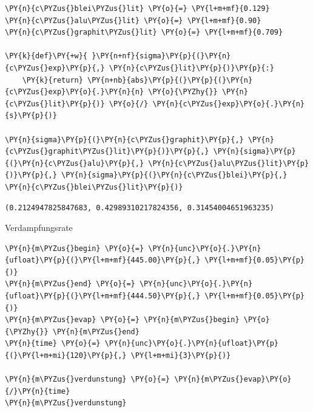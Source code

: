     \begin{tcolorbox}[breakable, size=fbox, boxrule=1pt, pad at break*=1mm,colback=cellbackground, colframe=cellborder]
\begin{Verbatim}[commandchars=\\\{\}]
\PY{n}{c\PYZus{}blei\PYZus{}lit} \PY{o}{=} \PY{l+m+mf}{0.129}
\PY{n}{c\PYZus{}alu\PYZus{}lit} \PY{o}{=} \PY{l+m+mf}{0.90}
\PY{n}{c\PYZus{}graphit\PYZus{}lit} \PY{o}{=} \PY{l+m+mf}{0.709}

\PY{k}{def}\PY{+w}{ }\PY{n+nf}{sigma}\PY{p}{(}\PY{n}{c\PYZus{}exp}\PY{p}{,} \PY{n}{c\PYZus{}lit}\PY{p}{)}\PY{p}{:}
    \PY{k}{return} \PY{n+nb}{abs}\PY{p}{(}\PY{p}{(}\PY{n}{c\PYZus{}exp}\PY{o}{.}\PY{n}{n} \PY{o}{\PYZhy{}} \PY{n}{c\PYZus{}lit}\PY{p}{)} \PY{o}{/} \PY{n}{c\PYZus{}exp}\PY{o}{.}\PY{n}{s}\PY{p}{)} 

\PY{n}{sigma}\PY{p}{(}\PY{n}{c\PYZus{}graphit}\PY{p}{,} \PY{n}{c\PYZus{}graphit\PYZus{}lit}\PY{p}{)}\PY{p}{,} \PY{n}{sigma}\PY{p}{(}\PY{n}{c\PYZus{}alu}\PY{p}{,} \PY{n}{c\PYZus{}alu\PYZus{}lit}\PY{p}{)}\PY{p}{,} \PY{n}{sigma}\PY{p}{(}\PY{n}{c\PYZus{}blei}\PY{p}{,} \PY{n}{c\PYZus{}blei\PYZus{}lit}\PY{p}{)}
\end{Verbatim}
\end{tcolorbox}

            \begin{tcolorbox}[breakable, size=fbox, boxrule=.5pt, pad at break*=1mm, opacityfill=0]
\begin{Verbatim}[commandchars=\\\{\}]
(0.2124947825847683, 0.42989310217824356, 0.31454004651963235)
\end{Verbatim}
\end{tcolorbox}
        
    Verdampfungsrate

    \begin{tcolorbox}[breakable, size=fbox, boxrule=1pt, pad at break*=1mm,colback=cellbackground, colframe=cellborder]
\begin{Verbatim}[commandchars=\\\{\}]
\PY{n}{m\PYZus{}begin} \PY{o}{=} \PY{n}{unc}\PY{o}{.}\PY{n}{ufloat}\PY{p}{(}\PY{l+m+mf}{445.00}\PY{p}{,} \PY{l+m+mf}{0.05}\PY{p}{)}
\PY{n}{m\PYZus{}end} \PY{o}{=} \PY{n}{unc}\PY{o}{.}\PY{n}{ufloat}\PY{p}{(}\PY{l+m+mf}{444.50}\PY{p}{,} \PY{l+m+mf}{0.05}\PY{p}{)}
\PY{n}{m\PYZus{}evap} \PY{o}{=} \PY{n}{m\PYZus{}begin} \PY{o}{\PYZhy{}} \PY{n}{m\PYZus{}end}
\PY{n}{time} \PY{o}{=} \PY{n}{unc}\PY{o}{.}\PY{n}{ufloat}\PY{p}{(}\PY{l+m+mi}{120}\PY{p}{,} \PY{l+m+mi}{3}\PY{p}{)}

\PY{n}{m\PYZus{}verdunstung} \PY{o}{=} \PY{n}{m\PYZus{}evap}\PY{o}{/}\PY{n}{time}
\PY{n}{m\PYZus{}verdunstung}
\end{Verbatim}
\end{tcolorbox}

